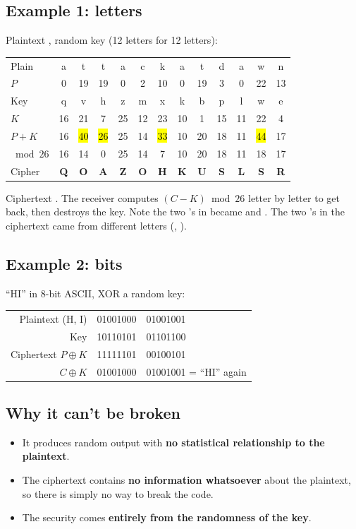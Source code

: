 \subsection{Example 1: letters}
Plaintext , random key  (12 letters for 12 letters):
\begin{center}\small\setlength{\tabcolsep}{4.5pt}
\begin{tabular}{@{}l*{12}{c}@{}}
\toprule
Plain & a&t&t&a&c&k&a&t&d&a&w&n\\
$P$ & 0&19&19&0&2&10&0&19&3&0&22&13\\
Key & q&v&h&z&m&x&k&b&p&l&w&e\\
$K$ & 16&21&7&25&12&23&10&1&15&11&22&4\\
$P+K$ & 16&\hl{40}&\hl{26}&25&14&\hl{33}&10&20&18&11&\hl{44}&17\\
$\bmod 26$ & 16&14&0&25&14&7&10&20&18&11&18&17\\
Cipher & \textbf{Q}&\textbf{O}&\textbf{A}&\textbf{Z}&\textbf{O}&\textbf{H}&\textbf{K}&\textbf{U}&\textbf{S}&\textbf{L}&\textbf{S}&\textbf{R}\\
\bottomrule
\end{tabular}
\end{center}
Ciphertext \textbf{}. The receiver computes $(C - K) \bmod 26$ letter by letter to get  back, then destroys the key.
Note the two 's in  became  and . The two 's in the ciphertext came from different letters (, ).

\subsection{Example 2: bits}
``HI'' in 8-bit ASCII, XOR a random key:
\begin{center}\small\ttfamily
\begin{tabular}{@{}r@{\quad}l@{\quad}l@{}}
\rmfamily Plaintext (H, I) & 01001000 & 01001001\\
\rmfamily Key & 10110101 & 01101100\\
\midrule
\rmfamily Ciphertext $P\oplus K$ & 11111101 & 00100101\\
\rmfamily $C \oplus K$ & 01001000 & 01001001 \rmfamily\;= ``HI'' again\\
\end{tabular}
\end{center}

\subsection{Why it can't be broken}
\begin{itemize}
  \item It produces random output with \textbf{no statistical relationship to the plaintext}.
  \item The ciphertext contains \textbf{no information whatsoever} about the plaintext, so there is simply no way to break the code.
  \item The security comes \textbf{entirely from the randomness of the key}.
\end{itemize}

